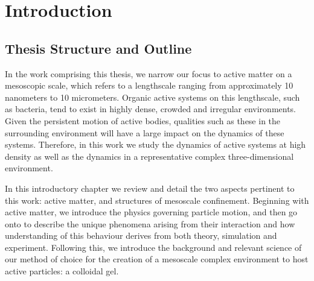 %
\let\textcircled=\pgftextcircled
\chapter{Introduction}
\label{chap:intro}

\section{Thesis Structure and Outline}

In the work comprising this thesis, we narrow our focus to active matter on a mesoscopic scale, which refers to a lengthscale ranging from approximately 10 nanometers to 10 micrometers. Organic active systems on this lengthscale, such as bacteria, tend to exist in highly dense, crowded and irregular environments. Given the persistent motion of active bodies, qualities such as these in the surrounding environment will have a large impact on the dynamics of these systems. Therefore, in this work we study the dynamics of active systems at high density as well as the dynamics in a representative complex three-dimensional environment. 

In this introductory chapter we review and detail the two aspects pertinent to this work: active matter, and structures of mesoscale confinement. Beginning with active matter, we introduce the physics governing particle motion, and then go onto to describe the unique phenomena arising from their interaction and how understanding of this behaviour derives from both theory, simulation and experiment. Following this, we introduce the background and relevant science of our method of choice for the creation of a mesoscale complex environment to host active particles: a colloidal gel. 